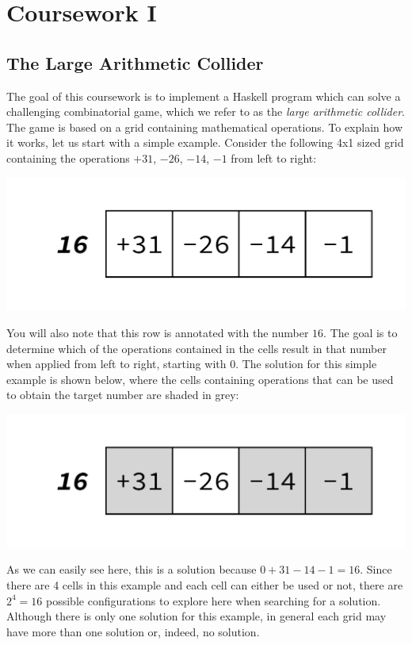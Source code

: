 
\newcommand{\deadlineOneTime}{noon}
\newcommand{\deadlineOneDate}{11 February 2020}
\newcommand{\submissionOneURL}{https://tabula.warwick.ac.uk/coursework/submission/43213a10-18dc-4e87-8364-c648097af402}
\newcommand{\classroomOneURL}{https://classroom.github.com/a/eQTilEdh}



\cleardoublepage
\chapter{Coursework I}

\section{The Large Arithmetic Collider}

The goal of this coursework is to implement a Haskell program which can solve a challenging combinatorial game, which we refer to as the \emph{large arithmetic collider}. The game is based on a grid containing mathematical operations. To explain how it works, let us start with a simple example. Consider the following 4x1 sized grid containing the operations $+31$, $-26$, $-14$, $-1$ from left to right:
\begin{center}
	\includegraphics[scale=0.4,trim=0 30 0 30]{cswk/lac1.pdf}
\end{center}
You will also note that this row is annotated with the number $16$. The goal is to determine which of the operations contained in the cells result in that number when applied from left to right, starting with $0$. The solution for this simple example is shown below, where the cells containing operations that can be used to obtain the target number are shaded in grey:
\begin{center}
	\includegraphics[scale=0.4,trim=0 30 0 30]{cswk/lac1s.pdf}
\end{center}
As we can easily see here, this is a solution because $0+31-14-1=16$. Since there are 4 cells in this example and each cell can either be used or not, there are $2^4=16$ possible configurations to explore here when searching for a solution. Although there is only one solution for this example, in general each grid may have more than one solution or, indeed, no solution. 

